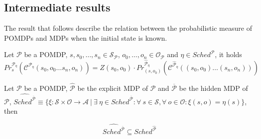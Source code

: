 \subsection*{Intermediate results}

The result that follows describe the relation between the probabilistic measure of \acp{POMDP} and \acp{MDP} when the initial state is known.

\begin{proposition}\label{prop:cyl1} 
Let $\mathcal{P}$ be a \ac{POMDP}, $s,s_0,\dots,s_n \in \mathcal{S}_{\mathcal{P}}$, $o_0,\dots,o_n \in \mathcal{O}_{\mathcal{P}}$ and $\eta \in Sched^{\mathcal{P}}$, it holds
	$$ Pr_{s}^{\mathcal{P}_\eta} (\mathcal{C}^{\mathcal{P}_\eta}(s_0,o_0\dots s_n,o_n)) = Z(s_0,o_0) \cdot Pr_{(s,o_0)}^{\widehat{\mathcal{P}}_\eta} (\mathcal{C}^{\widehat{\mathcal{P}}_\eta}((s_0,o_0)\dots(s_n,o_n))) $$
\end{proposition}

\begin{proposition}\label{prop:schedset}
Let $\mathcal{P}$ be a \ac{POMDP}, $\widehat{\mathcal{P}}$ be the explicit \ac{MDP} of $\mathcal{P}$ and $\overline{\mathcal{P}}$ be the hidden \ac{MDP} of $\mathcal{P}$, $\widehat{Sched^\mathcal{\overline{P}}} \equiv \{\xi: \mathcal{S}\times\mathcal{O}\rightarrow \mathcal{A}\ |\ \exists\ \eta \in Sched^{\overline{\mathcal{P}}} : \forall\ s \in \mathcal{S},\forall\ o \in \mathcal{O} : \xi(s,o) = \eta(s) \}$, then

$$ \widehat{Sched^\mathcal{\overline{P}}} \subseteq Sched^\mathcal{\widehat{P}} $$
\end{proposition}

